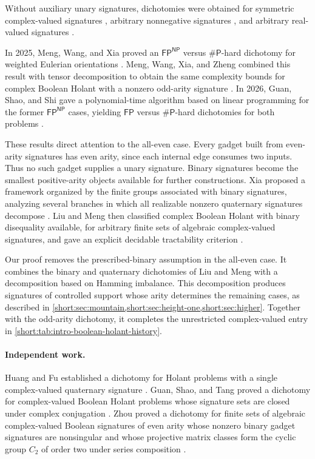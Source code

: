 \documentclass[11pt,letterpaper,onecolumn]{article}
\theoremstyle{plain}
\theoremstyle{definition}
\theoremstyle{remark}
\newcommand{\FP}{\mathsf{FP}}
\newcommand{\SharpP}{\#\mathsf P}
\begin{document}
Without auxiliary unary signatures, dichotomies were obtained for
symmetric complex-valued signatures \cite{CaiGuoWilliams2016}, arbitrary
nonnegative signatures \cite{LinWang2018}, and arbitrary real-valued
signatures \cite{ShaoCai2020}.

In 2025, Meng, Wang, and Xia proved an \(\FP^{\mathsf{NP}}\) versus
\(\SharpP\)-hard dichotomy for weighted Eulerian orientations
\cite{MengWangXia2025EO}.  Meng, Wang, Xia, and Zheng combined this result
with tensor decomposition to obtain the same complexity bounds for complex
Boolean Holant with a nonzero odd-arity signature
\cite{MengWangXiaZheng2025}.  In 2026, Guan, Shao, and Shi gave a
polynomial-time algorithm based on linear programming for the former
\(\FP^{\mathsf{NP}}\) cases, yielding \(\FP\) versus \(\SharpP\)-hard
dichotomies for both problems \cite{GuanShaoShi2026}.

These results direct attention to the all-even case.  Every gadget built
from even-arity signatures has even arity, since each internal edge consumes
two inputs.  Thus no such gadget supplies a unary signature.  Binary
signatures become the smallest positive-arity objects available for further
constructions.  Xia proposed a framework organized by the finite groups
associated with binary signatures, analyzing several branches in which all
realizable nonzero quaternary signatures decompose \cite{Xia2026Framework}.
Liu and Meng then classified complex Boolean Holant with binary
disequality available, for arbitrary finite sets of algebraic
complex-valued signatures, and gave an explicit decidable tractability
criterion \cite{Liu2026DEQ2Holant}.

Our proof removes the prescribed-binary assumption in the all-even case.
It combines the binary and quaternary dichotomies of Liu and Meng with a
decomposition based on Hamming imbalance.  This decomposition produces
signatures of controlled support whose arity determines the remaining
cases, as described in \cref{short:sec:mountain,short:sec:height-one,short:sec:higher}.  Together with the
odd-arity dichotomy, it completes the unrestricted complex-valued entry in
\cref{short:tab:intro-boolean-holant-history}.

\paragraph{Independent work.}
Huang and Fu established a dichotomy for Holant problems with a single
complex-valued quaternary signature \cite{HuangFu2026FourRegular}.
Guan, Shao, and Tang proved a dichotomy for complex-valued Boolean Holant
problems whose signature sets are closed under complex conjugation
\cite{GuanShaoTang2026ConjugateClosed}.
Zhou proved a dichotomy for finite sets of algebraic complex-valued Boolean
signatures of even arity whose nonzero binary gadget signatures are
nonsingular and whose projective matrix classes form the cyclic group
\(C_2\) of order two under series composition \cite{ZhouC2Holant}.
\end{document}
